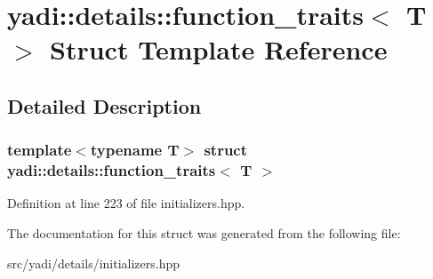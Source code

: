 \hypertarget{structyadi_1_1details_1_1function__traits}{}\section{yadi\+:\+:details\+:\+:function\+\_\+traits$<$ T $>$ Struct Template Reference}
\label{structyadi_1_1details_1_1function__traits}


\subsection{Detailed Description}
\subsubsection*{template$<$typename T$>$\newline
struct yadi\+::details\+::function\+\_\+traits$<$ T $>$}



Definition at line 223 of file initializers.\+hpp.



The documentation for this struct was generated from the following file\+:\begin{DoxyCompactItemize}
\item 
src/yadi/details/initializers.\+hpp\end{DoxyCompactItemize}
